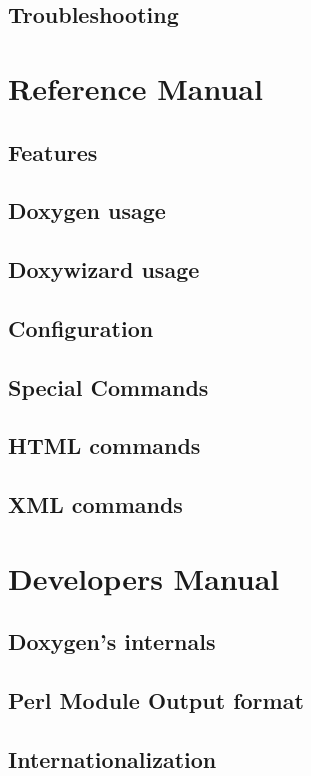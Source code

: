 \documentclass{book}
\newcommand{\+}{\discretionary{\mbox{\scriptsize$\hookleftarrow$}}{}{}}
\begin{document}
\chapter{Troubleshooting}\label{trouble}\hypertarget{trouble}{}
\part{Reference Manual}
\chapter{Features}\label{features}\hypertarget{features}{}
\chapter{Doxygen usage}\label{doxygen_usage}\hypertarget{doxygen_usage}{}
\chapter{Doxywizard usage}\label{doxywizard_usage}\hypertarget{doxywizard_usage}{}
\chapter{Configuration}\label{config}\hypertarget{config}{}
\chapter{Special Commands}\label{commands}\hypertarget{commands}{}
\chapter{HTML commands}\label{htmlcmds}\hypertarget{htmlcmds}{}
\chapter{XML commands}\label{xmlcmds}\hypertarget{xmlcmds}{}
\part{Developers Manual}
\chapter{Doxygen's internals}\label{arch}\hypertarget{arch}{}
\chapter{Perl Module Output format}\label{perlmod}\hypertarget{perlmod}{}
\chapter{Internationalization}\label{langhowto}\hypertarget{langhowto}{}
\printindex
\end{document}
